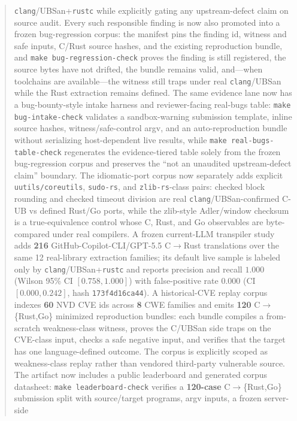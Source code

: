 \documentclass[10pt,a4paper]{article}
\begin{document}
\begin{abstract}
\texttt{clang}/UBSan+\texttt{rustc} while explicitly gating any upstream-defect
claim on source audit. Every such responsible finding is now also promoted into a
frozen bug-regression corpus: the manifest pins the finding id, witness and safe
inputs, C/Rust source hashes, and the existing reproduction bundle, and
\texttt{make bug-regression-check} proves the finding is still registered, the
source bytes have not drifted, the bundle remains valid, and---when toolchains are
available---the witness still traps under real \texttt{clang}/UBSan while the
Rust extraction remains defined. The same evidence lane now has a bug-bounty-style
intake harness and reviewer-facing real-bugs table: \texttt{make
bug-intake-check} validates a sandbox-warning submission template, inline source
hashes, witness/safe-control argv, and an auto-reproduction bundle without
serializing host-dependent live results, while \texttt{make
real-bugs-table-check} regenerates the evidence-tiered table solely from the
frozen bug-regression corpus and preserves the ``not an unaudited upstream-defect
claim'' boundary. The idiomatic-port corpus now separately adds explicit
\texttt{uutils/coreutils}, \texttt{sudo-rs}, and \texttt{zlib-rs}-class pairs:
checked block rounding and checked timeout division are real
\texttt{clang}/UBSan-confirmed C-UB vs defined Rust/Go ports, while the
zlib-style Adler/window checksum is a true-equivalence control whose C, Rust, and
Go observables are byte-compared under real compilers. A frozen current-LLM transpiler
study adds \textbf{216} GitHub-Copilot-CLI/GPT-5.5 C$\to$Rust translations over
the same 12 real-library extraction families; its default live sample is labeled
only by \texttt{clang}/UBSan+\texttt{rustc} and reports precision and recall
$1.000$ (Wilson 95\% CI $[0.758,1.000]$) with false-positive rate $0.000$
(CI $[0.000,0.242]$, hash \texttt{173f4d16ca44}). A historical-CVE replay corpus
indexes \textbf{60} NVD CVE ids across \textbf{8} CWE families and emits
\textbf{120} C$\to$\{Rust,Go\} minimized reproduction bundles: each bundle
compiles a from-scratch weakness-class witness, proves the C/UBSan side traps on
the CVE-class input, checks a safe negative input, and verifies that the target
has one language-defined outcome. The corpus is explicitly scoped as
weakness-class replay rather than vendored third-party vulnerable source. The
artifact now includes a public leaderboard and generated corpus datasheet:
\texttt{make leaderboard-check} verifies a \textbf{120-case} C$\to$\{Rust,Go\}
submission split with source/target programs, argv inputs, a frozen server-side

\end{abstract}
\end{document}
